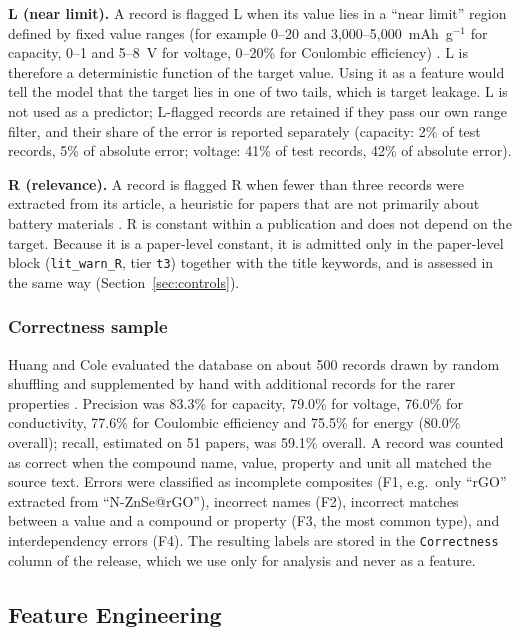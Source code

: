 \documentclass[journal=jcisd8,manuscript=article,layout=traditional]{achemso}
\begin{document}
\textbf{L (near limit).} A record is flagged L when its value lies in a ``near limit'' region defined by fixed value ranges (for example 0--20 and 3,000--5,000~mAh~g$^{-1}$ for capacity, 0--1 and 5--8~V for voltage, 0--20\% for Coulombic efficiency) \cite{huang2020database}. L is therefore a deterministic function of the target value. Using it as a feature would tell the model that the target lies in one of two tails, which is target leakage. L is not used as a predictor; L-flagged records are retained if they pass our own range filter, and their share of the error is reported separately (capacity: 2\% of test records, 5\% of absolute error; voltage: 41\% of test records, 42\% of absolute error).

\textbf{R (relevance).} A record is flagged R when fewer than three records were extracted from its article, a heuristic for papers that are not primarily about battery materials \cite{huang2020database}. R is constant within a publication and does not depend on the target. Because it is a paper-level constant, it is admitted only in the paper-level block (\texttt{lit\_warn\_R}, tier \texttt{t3}) together with the title keywords, and is assessed in the same way (Section~\ref{sec:controls}).

\subsubsection{Correctness sample}
\label{sec:quality}

Huang and Cole evaluated the database on about 500 records drawn by random shuffling and supplemented by hand with additional records for the rarer properties \cite{huang2020database}. Precision was 83.3\% for capacity, 79.0\% for voltage, 76.0\% for conductivity, 77.6\% for Coulombic efficiency and 75.5\% for energy (80.0\% overall); recall, estimated on 51 papers, was 59.1\% overall. A record was counted as correct when the compound name, value, property and unit all matched the source text. Errors were classified as incomplete composites (F1, e.g.\ only ``rGO'' extracted from ``N-ZnSe@rGO''), incorrect names (F2), incorrect matches between a value and a compound or property (F3, the most common type), and interdependency errors (F4). The resulting labels are stored in the \texttt{Correctness} column of the release, which we use only for analysis and never as a feature.

\subsection{Feature Engineering}
\label{sec:features}
\end{document}
